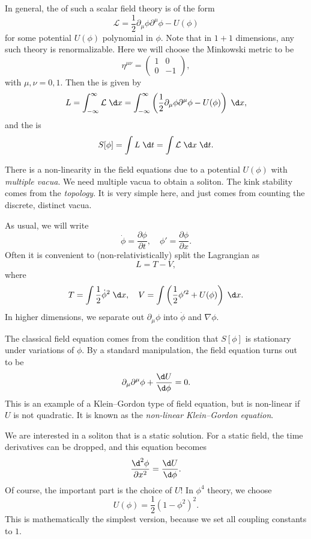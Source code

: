 \documentclass[a4paper]{article}
\begin{document}
In general, the  of such a scalar field theory is of the form
\[
  \mathcal{L} = \frac{1}{2} \partial_\mu \phi \partial^\mu \phi - U(\phi)
\]
for some potential $U(\phi)$ polynomial in $\phi$. Note that in $1 + 1$ dimensions, any such theory is renormalizable. Here we will choose the Minkowski metric to be
\[
  \eta^{\mu\nu} =
  \begin{pmatrix}
    1 & 0\\
    0 & -1
  \end{pmatrix},
\]
with $\mu, \nu = 0, 1$. Then the  is given by
\[
  L = \int_{-\infty}^\infty \mathcal{L}\;\d x = \int_{-\infty}^\infty \left(\frac{1}{2} \partial_\mu \phi \partial^\mu \phi - U(\phi)\right)\;\d x,
\]
and the  is
\[
  S[\phi] = \int L\;\d t = \int \mathcal{L} \;\d x\;\d t.
\]

There is a non-linearity in the field equations due to a potential $U(\phi)$ with \emph{multiple vacua}. We need multiple vacua to obtain a soliton. The kink stability comes from the \emph{topology}. It is very simple here, and just comes from counting the discrete, distinct vacua.

As usual, we will write
\[
  \dot{\phi} = \frac{\partial \phi}{\partial t},\quad \phi' = \frac{\partial \phi}{\partial x}.
\]
Often it is convenient to (non-relativistically) split the Lagrangian as
\[
  L = T - V,
\]
where
\[
  T = \int \frac{1}{2} \dot{\phi}^2\;\d x,\quad V = \int \left(\frac{1}{2} \phi'^2 + U(\phi)\right)\;\d x.
\]
In higher dimensions, we separate out $\partial_\mu \phi$ into $\dot{\phi}$ and $\nabla \phi$.

The classical field equation comes from the condition that $S[\phi]$ is stationary under variations of $\phi$. By a standard manipulation, the field equation turns out to be
\[
  \partial_\mu \partial^\mu \phi + \frac{\d U}{\d \phi} = 0.
\]
This is an example of a Klein--Gordon type of field equation, but is non-linear if $U$ is not quadratic. It is known as the \emph{non-linear Klein--Gordon equation}.

We are interested in a soliton that is a static solution. For a static field, the time derivatives can be dropped, and this equation becomes
\[
  \frac{\d^2 \phi}{\partial x^2} = \frac{\d U}{\d \phi}.
\]
Of course, the important part is the choice of $U$! In $\phi^4$ theory, we choose
\[
  U(\phi) = \frac{1}{2} (1 - \phi^2)^2.
\]
This is mathematically the simplest version, because we set all coupling constants to $1$.
\end{document}
